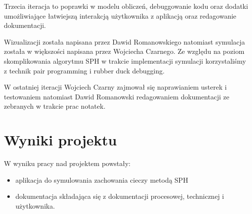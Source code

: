 \documentclass[polish, 12pt]{aghthesis}
\begin{document}
	Trzecia iteracja to poprawki w modelu obliczeń, debuggowanie kodu oraz dodatki umożliwiające łatwiejszą interakcją użytkownika z aplikacją oraz redagowanie dokumentacji.

	Wizualizacji została napisana przez Dawid Romanowskiego natomiast symulacja została w większości napisana przez Wojciecha Czarnego. Ze względu na poziom skomplikowania algorytmu SPH w trakcie implementacji symulacji korzystaliśmy z technik pair programming i rubber duck debugging.

	W ostatniej iteracji Wojciech Czarny zajmował się naprawianiem usterek i testowaniem natomiast Dawid Romanowski redagowaniem dokumentacji ze zebranych w trakcie prac notatek.

\section{Wyniki projektu}

	W wyniku pracy nad projektem powstały:
	\begin{itemize}
	\item aplikacja do symulowania zachowania cieczy metodą SPH
	\item dokumentacja składająca się z dokumentacji procesowej, technicznej i użytkownika.
	\end{itemize}

	
\end{document}
